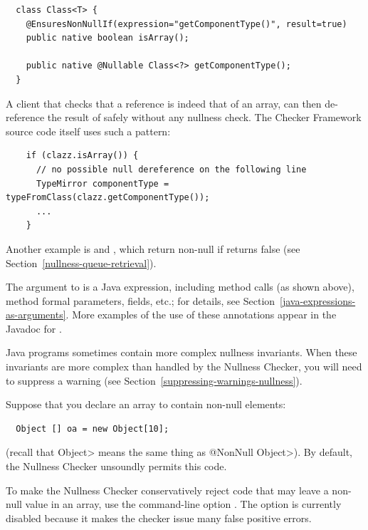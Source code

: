 \begin{Verbatim}
  class Class<T> {
    @EnsuresNonNullIf(expression="getComponentType()", result=true)
    public native boolean isArray();

    public native @Nullable Class<?> getComponentType();
  }
\end{Verbatim}

A client that checks that a  reference is indeed that of an array,
can then de-reference the result of  safely
without any nullness check.  The Checker Framework source code itself
uses such a pattern:

\begin{Verbatim}
    if (clazz.isArray()) {
      // no possible null dereference on the following line
      TypeMirror componentType = typeFromClass(clazz.getComponentType());
      ...
    }
\end{Verbatim}

Another example is 
and , which return
non-null if 
returns false (see Section~\ref{nullness-queue-retrieval}).

The argument to  is a Java expression, including method calls
(as shown above), method formal parameters, fields, etc.; for details, see
Section~\ref{java-expressions-as-arguments}.
More examples of the use of these annotations appear in the Javadoc for
.

Java programs sometimes contain more complex nullness invariants.  When
these invariants are more complex than handled by the Nullness Checker, you
will need to suppress a warning (see
Section~\ref{suppressing-warnings-nullness}).



Suppose that you declare an array to contain non-null elements:

\begin{Verbatim}
  Object [] oa = new Object[10];
\end{Verbatim}

\noindent
(recall that \<Object> means the same thing as \<@NonNull Object>).
By default, the Nullness Checker unsoundly permits this code.

To make the Nullness Checker conservatively reject code that may leave a
non-null value in an array, use the command-line option
.  The option is currently disabled
because it makes the checker issue many false positive errors.

